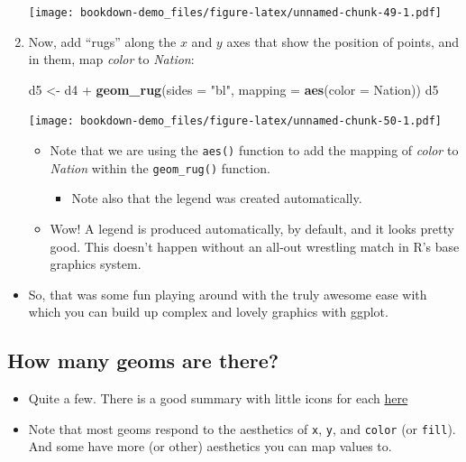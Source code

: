 \documentclass[]{book}
\newenvironment{Shaded}{\begin{snugshade}}{\end{snugshade}}
\newcommand{\KeywordTok}[1]{\textcolor[rgb]{0.13,0.29,0.53}{\textbf{{#1}}}}
\newcommand{\DataTypeTok}[1]{\textcolor[rgb]{0.13,0.29,0.53}{{#1}}}
\newcommand{\StringTok}[1]{\textcolor[rgb]{0.31,0.60,0.02}{{#1}}}
\newcommand{\NormalTok}[1]{{#1}}
\providecommand{\tightlist}{%
  \setlength{\itemsep}{0pt}\setlength{\parskip}{0pt}}
\theoremstyle{definition}
\theoremstyle{definition}
\theoremstyle{remark}
\begin{document}
\begin{enumerate}
  \texttt{[image: bookdown-demo\_files/figure-latex/unnamed-chunk-49-1.pdf]}
\item
  Now, add ``rugs'' along the \(x\) and \(y\) axes that show the
  position of points, and in them, map \emph{color} to \emph{Nation}:

\begin{Shaded}
\begin{Highlighting}[]
\NormalTok{d5 <-}\StringTok{ }\NormalTok{d4 +}\StringTok{ }\KeywordTok{geom_rug}\NormalTok{(}\DataTypeTok{sides =} \StringTok{"bl"}\NormalTok{, }\DataTypeTok{mapping =} \KeywordTok{aes}\NormalTok{(}\DataTypeTok{color =} \NormalTok{Nation))}
\NormalTok{d5}
\end{Highlighting}
\end{Shaded}

  \texttt{[image: bookdown-demo\_files/figure-latex/unnamed-chunk-50-1.pdf]}

  \begin{itemize}
  \tightlist
  \item
    Note that we are using the \texttt{aes()} function to add the
    mapping of \emph{color} to \emph{Nation} within the
    \texttt{geom\_rug()} function.

    \begin{itemize}
    \tightlist
    \item
      Note also that the legend was created automatically.
    \end{itemize}
  \item
    Wow! A legend is produced automatically, by default, and it looks
    pretty good. This doesn't happen without an all-out wrestling match
    in R's base graphics system.
  \end{itemize}
\end{enumerate}

\begin{itemize}
\tightlist
\item
  So, that was some fun playing around with the truly awesome ease with
  which you can build up complex and lovely graphics with ggplot.
\end{itemize}

\subsection{How many geoms are there?}\label{how-many-geoms-are-there}

\begin{itemize}
\tightlist
\item
  Quite a few. There is a good summary with little icons for each
  \href{http://docs.ggplot2.org/current/}{here}
\item
  Note that most geoms respond to the aesthetics of \texttt{x},
  \texttt{y}, and \texttt{color} (or \texttt{fill}). And some have more
  (or other) aesthetics you can map values to.
\end{itemize}
\end{document}
